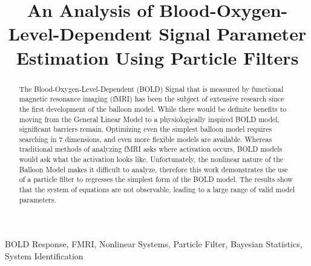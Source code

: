 \documentclass{article}
\title{An Analysis of Blood-Oxygen-Level-Dependent Signal Parameter Estimation Using Particle Filters}
\begin{document}
%
\maketitle
%
\begin{abstract}
The Blood-Oxygen-Level-Dependent (BOLD) Signal that is measured by functional 
magnetic resonance imaging (fMRI)
has been the subject of extensive research since the first development 
of the balloon model. While there would be definite benefits to 
moving from the General Linear Model to a physiologically inspired
BOLD model, significant barriers remain. Optimizing even the simplest
balloon model requires searching in 7 dimensions, and even more flexible
models are available. Whereas traditional methods of analyzing fMRI asks
where activation occurs, BOLD models would ask what the activation 
looks like. Unfortunately, the nonlinear nature of the Balloon Model
makes it difficult to analyze, therefore this work demonstrates the 
use of a particle filter to regresses the simplest form of the BOLD 
model. The results show that the system of equations are not observable,
leading to a large range of valid model parameters. 
\end{abstract}
%
\begin{keywords}
BOLD Response, FMRI, Nonlinear Systems, Particle Filter, Bayesian Statistics, System Identification
\end{keywords}
%

\begin{acronym}[CMRO2]
\end{acronym}
\end{document}
